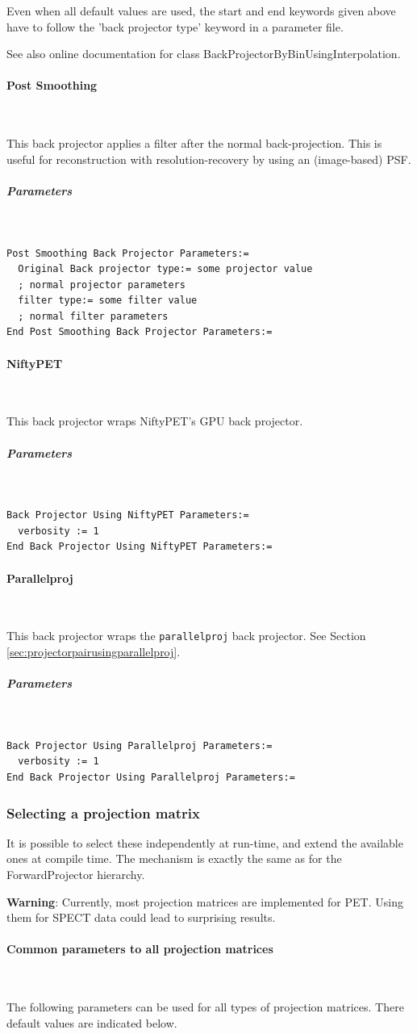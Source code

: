 \documentclass{article}
\newcommand{\subsubsubsection}[1]{\paragraph{#1}\mbox{} \\}
\newcommand{\subsubsubsubsection}[1]{\subparagraph{#1} \mbox{} \\}
\begin{document}
{{Even when all default values are used, the start and end keywords 
given above have to follow the 'back projector type' keyword 
in a parameter file.


See also online documentation for class BackProjectorByBinUsingInterpolation.

{ \subsubsubsection{Post Smoothing}
}
This back projector applies a filter after the normal back-projection.
This is useful for reconstruction with resolution-recovery 
by using an (image-based) PSF.

{ \subsubsubsubsection{Parameters}
}
\begin{verbatim}
Post Smoothing Back Projector Parameters:=
  Original Back projector type:= some projector value 
  ; normal projector parameters
  filter type:= some filter value
  ; normal filter parameters
End Post Smoothing Back Projector Parameters:=
\end{verbatim}

{ \subsubsubsection{NiftyPET}
}
This back projector wraps NiftyPET's GPU back projector.

{ \subsubsubsubsection{Parameters}
}
\begin{verbatim}
Back Projector Using NiftyPET Parameters:=
  verbosity := 1
End Back Projector Using NiftyPET Parameters:=
\end{verbatim}

{ \subsubsubsection{Parallelproj}
}
This back projector wraps the \texttt{parallelproj} back projector.
See Section \ref{sec:projectorpairusingparallelproj}.

{ \subsubsubsubsection{Parameters}
}
\begin{verbatim}
Back Projector Using Parallelproj Parameters:=
  verbosity := 1
End Back Projector Using Parallelproj Parameters:=
\end{verbatim}

\subsubsection{
Selecting a projection matrix}
\label{sec:projmatrix}
It is possible to select these independently at run-time, and 
extend the available ones at compile time. The mechanism is exactly 
the same as for the ForwardProjector hierarchy.

\textbf{Warning}: Currently, most projection matrices are implemented for PET. Using them for 
SPECT data could lead to surprising results. 

{ \subsubsubsection{Common parameters to all projection matrices}
}
\label{sec:projmatrixcommon}
The following parameters can be used for all types of projection 
matrices. There default values are indicated below.

}}
\end{document}
